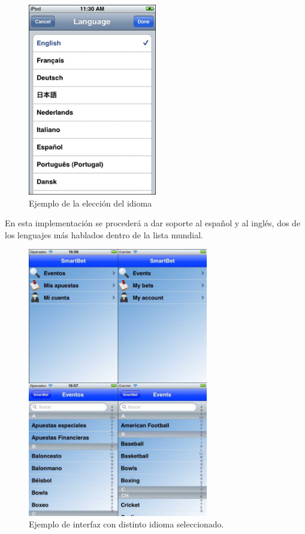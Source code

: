   \begin{figure}[h!]
    \centering
       \includegraphics[width=0.5\textwidth]{./images/language.jpg}
     \caption{Ejemplo de la elección del idioma }
   \label{fig:Vista de las preferencias del idioma}
\end{figure}

 
  En esta implementación se procederá a dar soporte al español y al inglés, dos de los lenguajes más hablados dentro de la lista mundial.
  
  
  
  \begin{figure}[h!]
  	\centering 
  		\includegraphics[width=0.7\textwidth]{./images/lenguajes.jpg}
	\caption{Ejemplo de interfaz con distinto idioma seleccionado.} 
	\label{fig:Ejemplo de interfaz con distinto idioma seleccionado.}
\end{figure} 
  
